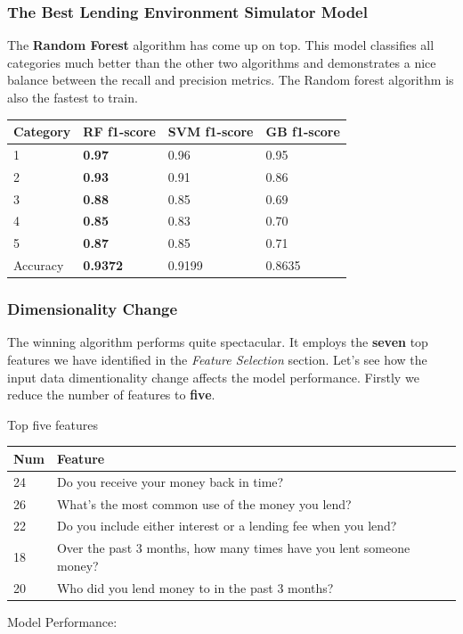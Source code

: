 \hypertarget{the-best-lending-environment-simulator-model}{%
\subsubsection{The Best Lending Environment Simulator
Model}\label{the-best-lending-environment-simulator-model}}

The \textbf{Random Forest} algorithm has come up on top. This model
classifies all categories much better than the other two algorithms and
demonstrates a nice balance between the recall and precision metrics.
The Random forest algorithm is also the fastest to train.

\begin{longtable}[]{@{}llll@{}}
\toprule
Category & \textbf{RF f1-score} & SVM f1-score & GB
f1-score\tabularnewline
\midrule
\endhead
1 & \textbf{0.97} & 0.96 & 0.95\tabularnewline
2 & \textbf{0.93} & 0.91 & 0.86\tabularnewline
3 & \textbf{0.88} & 0.85 & 0.69\tabularnewline
4 & \textbf{0.85} & 0.83 & 0.70\tabularnewline
5 & \textbf{0.87} & 0.85 & 0.71\tabularnewline
Accuracy & \textbf{0.9372} & 0.9199 & 0.8635\tabularnewline
\bottomrule
\end{longtable}

\hypertarget{dimensionality-change}{%
\subsubsection{Dimensionality Change}\label{dimensionality-change}}

The winning algorithm performs quite spectacular. It employs the
\textbf{seven} top features we have identified in the \emph{Feature
Selection} section. Let's see how the input data dimentionality change
affects the model performance. Firstly we reduce the number of features
to \textbf{five}.

Top five features

\begin{longtable}[]{@{}ll@{}}
\toprule
Num & Feature\tabularnewline
\midrule
\endhead
24 & Do you receive your money back in time?\tabularnewline
26 & What's the most common use of the money you lend?\tabularnewline
22 & Do you include either interest or a lending fee when you
lend?\tabularnewline
18 & Over the past 3 months, how many times have you lent someone
money?\tabularnewline
20 & Who did you lend money to in the past 3 months?\tabularnewline
\bottomrule
\end{longtable}

Model Performance:

